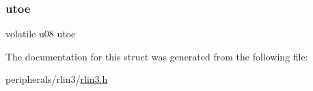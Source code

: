\mbox{\label{structrlin3__luoer_ab76182824a36bc7613ff945d6d0b9e72}} 
\subsubsection{\texorpdfstring{utoe}{utoe}}
{\footnotesize\ttfamily volatile u08 utoe}



The documentation for this struct was generated from the following file\+:\begin{DoxyCompactItemize}
\item 
peripherals/rlin3/\mbox{\hyperlink{rlin3_8h}{rlin3.\+h}}\end{DoxyCompactItemize}
